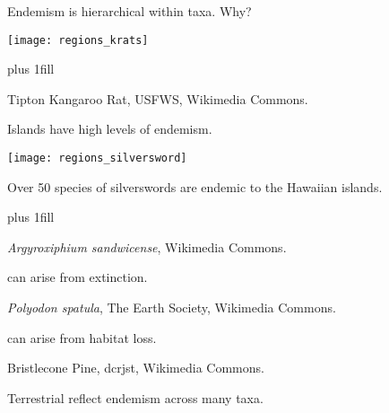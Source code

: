 \documentclass[t]{beamer}
\begin{document}
\begin{frame}[t,plain]{Endemism is hierarchical within taxa. Why?}

	\begin{center}
		\texttt{[image: regions\_krats]}
	\end{center}

	\vskip0pt plus 1fill
	
	\tiny\hfill Tipton Kangaroo Rat, USFWS, Wikimedia Commons.
\end{frame}


\begin{frame}[t,plain]{Islands have high levels of endemism.}
\begin{multicols}{2}

	\texttt{[image: regions\_silversword]}

	\columnbreak

	\vspace*{2\baselineskip}	

	\noindent Over 50 species of silverswords are endemic to the Hawaiian islands.
	
\end{multicols}

	\vskip0pt plus 1fill
	
	\tiny\hfill\textit{Argyroxiphium sandwicense}, Wikimedia Commons.

\end{frame}

{
\begin{frame}[b,plain]{ can arise from extinction.}

\tiny\hfill\textit{Polyodon spatula}, The Earth Society, Wikimedia Commons.
\end{frame}
}

{
\begin{frame}[b,plain]{ can arise from habitat loss.}

\tiny\hfill Bristlecone Pine, dcrjst, Wikimedia Commons.
\end{frame}
}

{
\begin{frame}[b,plain]{Terrestrial  reflect endemism across many taxa.}

\end{frame}
}
\end{document}
